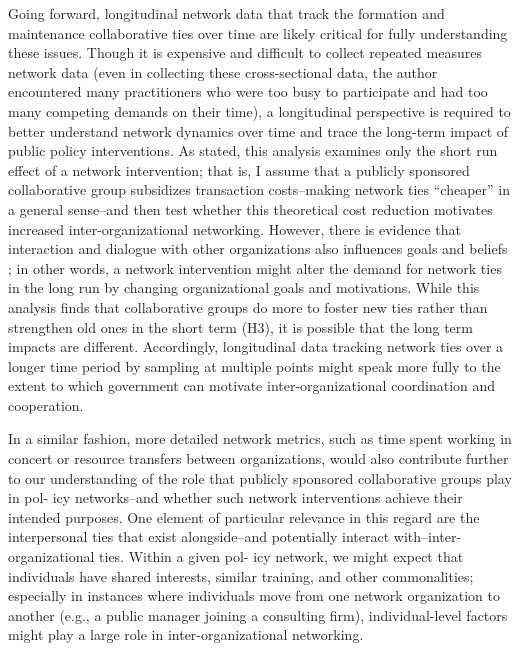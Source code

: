 \documentclass[12pt,a4paper,titlepage]{article}
\begin{document}
Going forward, longitudinal network data that track the formation and maintenance collaborative ties over time are likely critical for fully understanding these issues. Though it is expensive and difficult to collect repeated measures network data (even in collecting these cross-sectional data, the author encountered many practitioners who were too busy to participate and had too many competing demands on their time), a longitudinal perspective is required to better understand network dynamics over time and trace the long-term impact of public policy interventions. As stated, this analysis examines only the short run effect of a network intervention; that is, I assume that a publicly sponsored collaborative group subsidizes transaction costs--making network ties ``cheaper'' in a general sense--and then test whether this theoretical cost reduction motivates increased inter-organizational networking. However, there is evidence that interaction and dialogue with other organizations also influences goals and beliefs \parencite{bingham2008,innes2010,leach2005,lubell2005}; in other words, a network intervention might alter the demand for network ties in the long run by changing organizational goals and motivations. While this analysis finds that collaborative groups do more to foster new ties rather than strengthen old ones in the short term (H3), it is possible that the long term impacts are different. Accordingly, longitudinal data tracking network ties over a longer time period by sampling at multiple points might speak more fully to the extent to which government can motivate inter-organizational coordination and cooperation. 

In a similar fashion, more detailed network metrics, such as time spent working in concert or resource transfers between organizations, would also contribute further to our understanding of the role that publicly sponsored collaborative groups play in pol- icy networks–and whether such network interventions achieve their intended purposes. One element of particular relevance in this regard are the interpersonal ties that exist alongside–and potentially interact with–inter-organizational ties. Within a given pol- icy network, we might expect that individuals have shared interests, similar training, and other commonalities; especially in instances where individuals move from one network organization to another (e.g., a public manager joining a consulting firm), individual-level factors might play a large role in inter-organizational networking.
\end{document}

